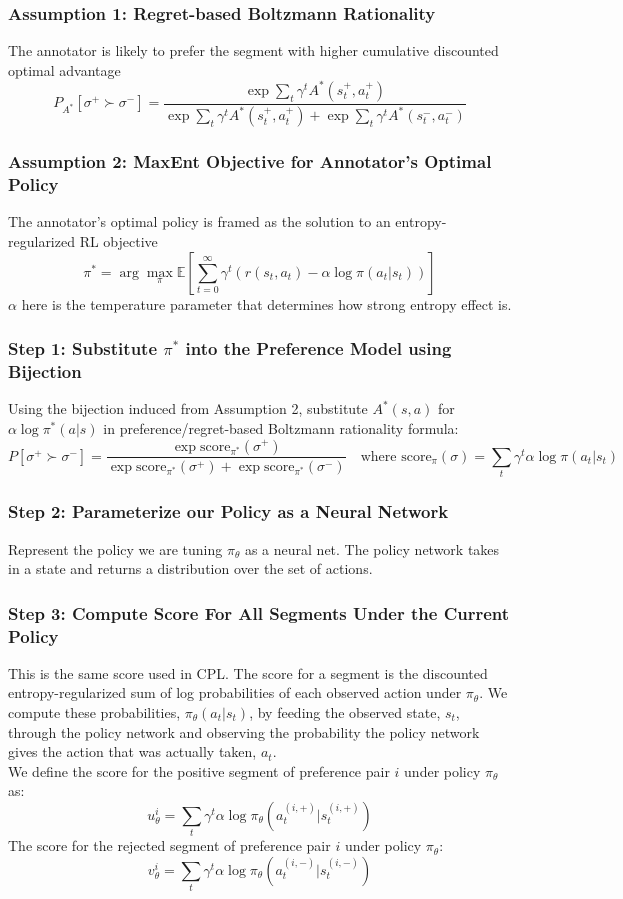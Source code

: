 \documentclass[11pt]{article}
\begin{document}
\subsubsection*{Assumption 1: Regret-based Boltzmann Rationality}
The annotator is likely to prefer the segment with higher cumulative discounted optimal advantage
$$P_{A^*}[\sigma^+ \succ \sigma^-] = \frac{\exp \sum_t \gamma^t A^*(s_t^+, a_t^+)}{\exp \sum_t \gamma^t A^*(s_t^+, a_t^+) + \exp \sum_t \gamma^t A^*(s_t^-, a_t^-)}$$

\subsubsection*{Assumption 2: MaxEnt Objective for Annotator's Optimal Policy}
The annotator's optimal policy is framed as the solution to an entropy-regularized RL objective
$$\pi^* = \arg\max_\pi \mathbb{E} \left[ \sum_{t=0}^\infty \gamma^t (r(s_t, a_t) - \alpha \log \pi(a_t|s_t)) \right]$$
$\alpha$ here is the temperature parameter that determines how strong entropy effect is.\\

\subsubsection*{Step 1: Substitute $\pi^*$ into the Preference Model using Bijection}
Using the bijection induced from Assumption 2, substitute $A^*(s, a)$ for $\alpha \log \pi^*(a|s)$ in preference/regret-based Boltzmann rationality formula:
$$P[\sigma^+ \succ \sigma^-] = \frac{\exp \text{score}_{\pi^*}(\sigma^+)}{\exp \text{score}_{\pi^*}(\sigma^+) + \exp \text{score}_{\pi^*}(\sigma^-)} \quad \text{where } \text{score}_\pi(\sigma) = \sum_t \gamma^t \alpha \log \pi(a_t|s_t)$$

\subsubsection*{Step 2: Parameterize our Policy as a Neural Network}
Represent the policy we are tuning $\pi_\theta$ as a neural net. The policy network takes in a state and returns a distribution over the set of actions.

\subsubsection*{Step 3: Compute Score For All Segments Under the Current Policy}
This is the same score used in CPL. The score for a segment is the discounted entropy-regularized sum of log probabilities of each observed action under $\pi_\theta$. We compute these probabilities, $\pi_\theta(a_t|s_t)$, by feeding the observed state, $s_t$, through the policy network and observing the probability the policy network gives the action that was actually taken, $a_t$.\\
We define the score for the positive segment of preference pair $i$ under policy $\pi_\theta$ as:
$$u_\theta^i=\sum_{t}\gamma^t \alpha \log \pi_\theta(a_t^{(i,+)}|s_t^{(i,+)})$$
The score for the rejected segment of preference pair $i$ under policy $\pi_\theta$:\\
$$v_\theta^i=\sum_{t}\gamma^t \alpha \log \pi_\theta(a_t^{(i,-)}|s_t^{(i,-)})$$
\end{document}
